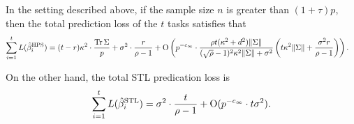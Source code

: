 \begin{corollary}\label{prop_same_cov}
	In the setting described above, if the sample size $n$ is greater than $(1 + \tau) p$, then the total prediction loss of the $t$ tasks satisfies that
	\begin{align*}
	 \sum_{i=1}^t L(\hat{\beta}_i^{\textup{HPS}})&= (t-r) \kappa^2 \cdot \frac{\operatorname{Tr}\Sigma}{p}  + \sigma^2 \cdot \frac{r}{\rho-1} +\operatorname{O}\left( p^{-c_\infty} \cdot\frac{\rho t(\kappa^2 + d^2) \|\Sigma\|}{(\sqrt{\rho}-1)^2 \kappa^2  \|\Sigma\| + \sigma^2}   \left( t \kappa^2 \|\Sigma \| + \frac{\sigma^2 r}{\rho-1} \right)  \right) .
	\end{align*}
\end{corollary}
On the other hand, the total STL predication loss is
\begin{align*}
 \sum_{i=1}^t L(\hat{\beta}_i^{\textup{STL}}) =\sigma^2\cdot \frac{t}{ \rho-1}  +\operatorname{O}(p^{-c_\infty}\cdot t \sigma^2 ).
	 \end{align*}



